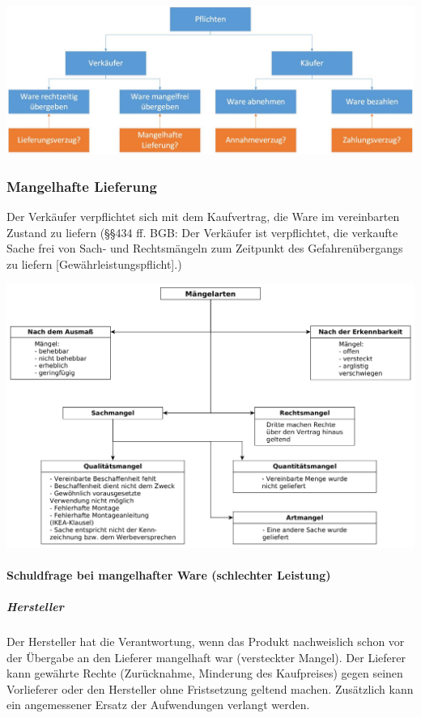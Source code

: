 \includegraphics[scale=0.35]{pictures/lf01-pic/lf01-pflichten-kaufvertrag.jpg}

\subsubsection{Mangelhafte Lieferung}
Der Verkäufer verpflichtet sich mit dem Kaufvertrag, die Ware im vereinbarten Zustand zu liefern (§§434 ff. BGB: Der Verkäufer ist verpflichtet, die verkaufte Sache frei von Sach- und Rechtsmängeln zum Zeitpunkt des Gefahrenübergangs zu liefern [Gewährleistungspflicht].)

\includegraphics[scale=0.26]{pictures/lf01-pic/lf01-maengelarten.png}

\paragraph{Schuldfrage bei mangelhafter Ware (schlechter Leistung)}
	
\subparagraph{Hersteller} Der Hersteller hat die Verantwortung, wenn das Produkt nachweislich schon vor der Übergabe an den Lieferer mangelhaft war (versteckter Mangel). Der Lieferer kann gewährte Rechte (Zurücknahme, Minderung des Kaufpreises) gegen seinen Vorlieferer oder den Hersteller ohne Fristsetzung geltend machen. Zusätzlich kann ein angemessener Ersatz der Aufwendungen verlangt werden.

